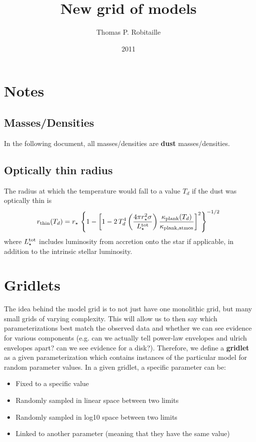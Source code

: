 \documentclass[10pt]{article}
\begin{document}
\title{New grid of models}
\author{Thomas P. Robitaille}
\date{2011}
\maketitle

\section{Notes}

\subsection{Masses/Densities}

In the following document, all masses/densities are \textbf{dust} masses/densities.

\subsection{Optically thin radius}

The radius at which the temperature would fall to a value $T_d$ if the dust was optically thin is
$$
r_{\rm thin}(T_d) = r_{\star} \, \left\{1-\left[1-2\,T_d^4\left(\frac{4\pi r_\star^2\sigma}{L_\star^{\rm tot}}\right)\frac{\kappa_{\rm plank}(T_d)}{\kappa_{\rm plank, atmos}}\right]^2\right\} ^ {-1/2}
$$
where $L_\star^{\rm tot}$ includes luminosity from accretion onto the star if applicable, in addition to the intrinsic stellar luminosity.

\section{Gridlets}

The idea behind the model grid is to not just have one monolithic grid, but many small grids of varying complexity. This will allow us to then say which parameterizations best match the observed data and whether we can see evidence for various components (e.g. can we actually tell power-law envelopes and ulrich envelopes apart? can we see evidence for a disk?). Therefore, we define a \textbf{gridlet} as a given parameterization which contains instances of the particular model for random parameter values. In a given gridlet, a specific parameter can be:

\begin{itemize}
\item Fixed to a specific value
\item Randomly sampled in linear space between two limits
\item Randomly sampled in log10 space between two limits
\item Linked to another parameter (meaning that they have the same value)
\end{itemize}
\end{document}
